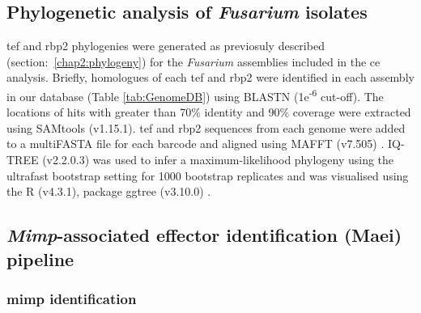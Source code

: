 \bigskip

\bigskip

\newpage

\subsection{Phylogenetic analysis of \textit{Fusarium} isolates}

\Ac{tef} and \ac{rbp2} phylogenies were generated as previosuly described (section:~\ref{chap2:phylogeny}) for the \textit{Fusarium} assemblies included in the \ac{ce} analysis. Briefly, homologues of each \ac{tef} and \ac{rbp2} were identified in each assembly in our database  (Table \ref{tab:GenomeDB}) using BLASTN (1e\textsuperscript{-6} cut-off). The locations of hits with greater than 70\% identity and 90\% coverage were extracted using SAMtools (v1.15.1). \Ac{tef} and \ac{rbp2} sequences from each genome were added to a  multiFASTA file for each barcode and aligned using MAFFT (v7.505) \parencite{Katoh2019}. IQ-TREE (v2.2.0.3) \parencite{Nguyen2015} was used to infer a maximum-likelihood phylogeny using the ultrafast bootstrap setting for 1000 bootstrap replicates and was visualised using the R \parencite{R} (v4.3.1), package ggtree (v3.10.0) \parencite{ggtree}.

\subsection{\textit{Mimp}-associated effector identification (Maei) pipeline}

\subsubsection{\Ac{mimp} identification}

